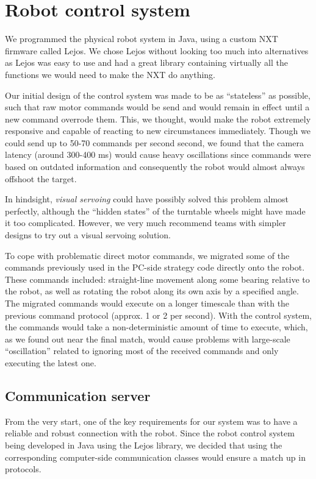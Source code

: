 \documentclass[12pt,a4paper,notitlepage,twocolumn]{report}
\begin{document}
\section*{Robot control system}
We programmed the physical robot system in Java, using a custom NXT
firmware called Lejos. We chose Lejos without looking too much into
alternatives as Lejos was easy to use and had a great library
containing virtually all the functions we would need to make the NXT
do anything.

Our initial design of the control system was made to be as “stateless”
as possible, such that raw motor commands would be send and would
remain in effect until a new command overrode them. This, we thought,
would make the robot extremely responsive and capable of reacting to
new circumstances immediately. Though we could send up to 50-70
commands per second second, we found that the camera latency (around
300-400 ms) would cause heavy oscillations since commands were based
on outdated information and consequently the robot would almost always
offshoot the target.

In hindsight, \emph{visual servoing} could have possibly solved this problem
almost perfectly, although the “hidden states” of the turntable wheels
might have made it too complicated. However, we very much recommend
teams with simpler designs to try out a visual servoing solution.

To cope with problematic direct motor commands, we migrated some of
the commands previously used in the PC-side strategy code directly
onto the robot. These commands included: straight-line movement along
some bearing relative to the robot, as well as rotating the robot
along its own axis by a specified angle. The migrated commands would
execute on a longer timescale than with the previous command protocol
(approx. 1 or 2 per second). With the control system, the commands
would take a non-deterministic amount of time to execute, which, as we
found out near the final match, would cause problems with large-scale
“oscillation” related to ignoring most of the received commands and
only executing the latest one.

\subsection*{Communication server}
From the very start, one of the key requirements for our system was to
have a reliable and robust connection with the robot. Since the robot
control system being developed in Java using the Lejos library, we
decided that using the corresponding computer-side communication
classes would ensure a match up in protocols.
\end{document}
